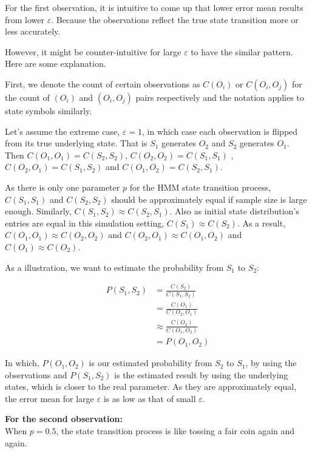 \documentclass[paper=a4, fontsize=11pt]{scrartcl} %
\numberwithin{equation}{section} %
\numberwithin{figure}{section} %
\numberwithin{table}{section} %
\begin{document}
For the first observation, it is intuitive to come up that lower error mean results from lower $\varepsilon$. Because the observations reflect the true state transition more or less accurately. 

However, it might be counter-intuitive for large $\varepsilon$ to have the similar pattern. Here are some explanation. 

First, we denote the count of certain observations as $C (O_i)$ or $C (O_i, O_j)$ for the count of $(O_i)$ and $(O_i, O_j)$ pairs respectively and the notation applies to state symbols similarly.

Let's assume the extreme case, $\varepsilon=1$, in which case each observation is flipped from its true underlying state. That is $S_1$ generates $O_2$ and $S_2$ generates $O_1$. Then $C (O_1, O_1) = C (S_2, S_2)$, $C (O_2, O_2) = C (S_1, S_1)$ , $C (O_2, O_1) = C (S_1, S_2)$ and $C (O_1, O_2) = C (S_2, S_1)$.

As there is only one parameter $p$ for the HMM state transition process, $C(S_1,S_1) $ and $ C(S_2,S_2)$ should be approximately equal if sample size is large enough. Similarly, $C(S_1, S_2) \approx C(S_2, S_1)$. Also as initial state distribution's entries are equal in this simulation setting, $C (S_1) \approx C (S_2)$.  As a result, $C (O_1, O_1) \approx C (O_2, O_2)$ and $C (O_2, O_1) \approx C (O_1, O_2)$ and $C (O_1) \approx C (O_2)$. 

As a illustration, we want to estimate the probability from $S_1$ to $S_2$:

\begin {align*}
  P (S_1, S_2) &= \frac {C (S_2)} {C (S_1, S_2)} \\
  &= \frac {C (O_1)} {C (O_2, O_1)} \\
  &\approx \frac {C (O_2)} {C (O_1, O_2)}\\
  &=P (O_1, O_2)
\end {align*}

In which, $P (O_1, O_2)$ is our estimated probability from $S_2$ to $S_1$, by using the observations and  $P (S_1, S_2)$ is the estimated result by using the underlying states, which is closer to the real parameter. As they are approximately equal, the error mean for large $\varepsilon$ is as low as that of small $\varepsilon$.

\textbf{For the second observation:} \\

When $p=0.5$, the state transition process is like tossing a fair coin again and again.
\end{document}
